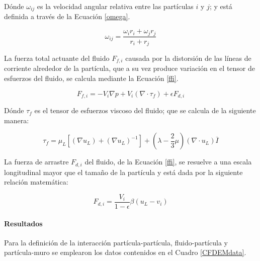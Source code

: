 \noindent
\justify

D\'onde $\omega _{ij}$ es la velocidad angular relativa entre las part\'iculas $i$ y $j$; y est\'a definida a trav\'es de la Ecuaci\'on \ref{omega}.

\begin{equation}
	\omega _{ij} = \frac{\omega _i r_i + \omega _j r_j}{r_i + r_j}
	\label{omega}
\end{equation}

\noindent
\justify

La fuerza total actuante del fluido $F_{f,i}$ causada por la distorsi\'on de las l\'ineas de corriente alrededor de la part\'icula, que a su vez produce variaci\'on en el tensor de esfuerzos del fluido, se calcula mediante la Ecuaci\'on \ref{ffi}.

\begin{equation}
	F_{f,i} = - V_i \nabla p + V_i \left( \nabla \cdot \tau _f \right) + \epsilon F_{d,i}
	\label{ffi}
\end{equation}

\noindent
\justify

D\'onde $\tau _f$ es el tensor de esfuerzos viscoso del fluido; que se calcula de la siguiente manera:

\begin{equation}
	\tau _f = \mu _L \left[ \left( \nabla u_L \right) + \left( \nabla u_L \right) ^{-1} \right] + \left(\lambda - \frac{2}{3} \mu \right) \left( \nabla \cdot u_L \right) \overline{I}
\end{equation}

\noindent
\justify

La fuerza de arrastre $F_{d,i}$ del fluido, de la Ecuaci\'on \ref{ffi}, se resuelve a una escala longitudinal mayor que el tama\~no de la part\'icula y est\'a dada por la siguiente relaci\'on matem\'atica:

\begin{equation}
	F_{d,i} = \frac{V_i}{1 - \epsilon} \beta \left( u_L - v_i \right)
\end{equation}

\paragraph{Resultados}

\noindent
\justify

Para la definici\'on de la interacci\'on part\'icula-part\'icula, fluido-part\'icula y part\'icula-muro se emplearon los datos contenidos en el Cuadro \ref{CFDEMdata}.

